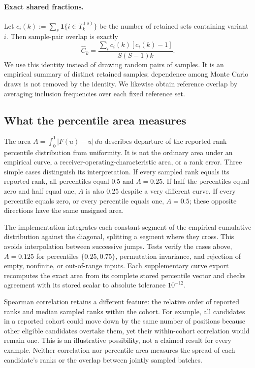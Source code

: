 \paragraph{Exact shared fractions.}
Let $c_i(k):=\sum_s\mathbf{1}\{i\in T_k^{(s)}\}$ be the number of retained
sets containing variant $i$. Then sample-pair overlap is exactly
\[
\widehat C_k=\frac{\sum_i c_i(k)[c_i(k)-1]}{S(S-1)k}.
\]
We use this identity instead of drawing random pairs of samples. It is an
empirical summary of distinct retained samples; dependence among Monte
Carlo draws is not removed by the identity. We likewise obtain reference
overlap by averaging inclusion frequencies over each fixed reference set.

\subsection{What the percentile area measures}
\label{app:area-interpretation}

The area $A=\int_0^1|F(u)-u|\,du$ describes departure of the
reported-rank percentile distribution from uniformity. It is not the
ordinary area under an empirical curve, a receiver-operating-characteristic
area, or a rank error. Three simple cases distinguish its interpretation.
If every sampled rank equals its reported rank, all percentiles equal
0.5 and $A=0.25$. If half the percentiles equal zero and half equal
one, $A$ is also 0.25 despite a very different curve. If every
percentile equals zero, or every percentile equals one, $A=0.5$;
these opposite directions have the same unsigned area.

The implementation integrates each constant segment of the empirical
cumulative distribution against the diagonal, splitting a segment where
they cross. This avoids interpolation between successive jumps. Tests
verify the cases above, $A=0.125$ for percentiles $\{0.25,0.75\}$,
permutation invariance, and rejection of empty, nonfinite, or out-of-range
inputs. Each supplementary curve export recomputes the exact area from
its complete stored percentile vector and checks agreement with its
stored scalar to absolute tolerance $10^{-12}$.

Spearman correlation retains a different feature: the relative order
of reported ranks and median sampled ranks within the cohort. For
example, all candidates in a reported cohort could move down by the
same number of positions because other eligible candidates overtake
them, yet their within-cohort correlation would remain one. This is
an illustrative possibility, not a claimed result for every example.
Neither correlation nor percentile area measures the spread of each
candidate's ranks or the overlap between jointly sampled batches.

